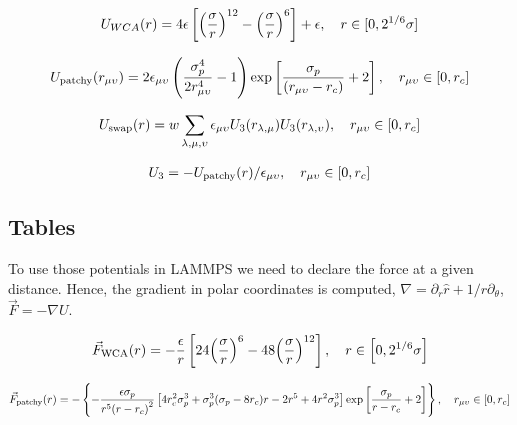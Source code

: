\documentclass[main.tex]{subfiles}
\begin{document}
\begin{gather}
    U_{WCA}(r) = 4\epsilon\left[\qty(\frac{\sigma}{r})^{12}-\qty(\frac{\sigma}{r})^6\right]+\epsilon,\quad r\in[0,2^{1/6}\sigma]\label{eqn:CL-MO_interaction}
\end{gather}

\begin{gather}
    U_{\mathrm{patchy}}\qty(r_{\mu\upsilon}) = 2\epsilon_{\mu\upsilon}\left(\frac{\sigma_p^4}{2 r_{\mu\upsilon}^4}-1\right)\exp\left[\frac{\sigma_p}{\qty(r_{\mu\upsilon}-r_{c})}+2\right],\quad r_{\mu\upsilon}\in\qty[0,r_c] \label{eqn:patch-patch_interaction}
\end{gather}

\begin{gather}
	U_{\mathrm{swap}}(r) = w\sum_{\lambda,\mu,\upsilon}\epsilon_{\mu\upsilon}U_3\qty(r_{\lambda,\mu})U_3\qty(r_{\lambda,\upsilon}),\quad r_{\mu\upsilon}\in\qty[0,r_c]\label{eqn:swap_interaction}
\end{gather}

\begin{gather}
	U_{3} = -U_{\mathrm{patchy}}\qty(r)/\epsilon_{\mu\upsilon}\label{eqn:swapmod_interaction},\quad r_{\mu\upsilon}\in\qty[0,r_c]
\end{gather}

\subsection{Tables}

To use those potentials in LAMMPS we need to declare the force at a given distance.
Hence, the gradient in polar coordinates is computed, $\nabla = \partial_{r}\hat{r} + 1/r\partial_\theta$, $\vec{F}=-\nabla U$.

\begin{gather}
    \vec{F}_{\mathrm{WCA}}(r) = -\frac{\epsilon}{r}\left[24\qty(\frac{\sigma}{r})^6-48\qty(\frac{\sigma}{r})^{12}\right],\quad r\in\qty[0,2^{1/6}\sigma] %
\end{gather}


\begin{gather}
    \vec{F}_{\mathrm{patchy}}(r) =-\left\{ -\frac{\epsilon\sigma_p}{r^5\qty(r-r_c)^2} \left[ 4r_c^2\sigma^3_p + \sigma^3_p\qty(\sigma_p-8r_c) r -2r^5 + 4r^2 \sigma^3_p \right] \exp\left[\frac{\sigma_p}{r-r_c}+2\right]\right\},\quad r_{\mu\upsilon}\in\qty[0,r_c]
\end{gather}
\end{document}
